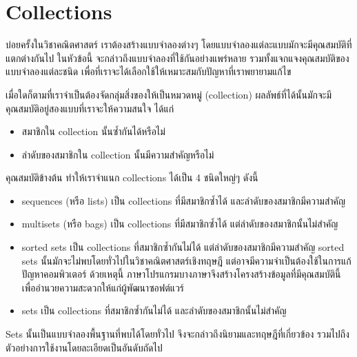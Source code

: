 \chapter{Collections}

บ่อยครั้งในวิชาคณิตศาสตร์ เราต้องสร้างแบบจำลองต่างๆ โดยแบบจำลองแต่ละแบบมักจะมีคุณสมบัติที่แตกต่างกันไป \enskip ในหัวข้อนี้ จะกล่าวถึงแบบจำลองที่ใช้กันอย่างแพร่หลาย รวมทั้งแจกแจงคุณสมบัติของแบบจำลองแต่ละชนิด เพื่อที่เราจะได้เลือกใช้ให้เหมาะสมกับปัญหาที่เราพยายามแก้ไข

เมื่อใดก็ตามที่เราจำเป็นต้องจัดกลุ่มสิ่งของให้เป็นหมวดหมู่ (collection) ผลลัพธ์ที่ได้นั้นมักจะมีคุณสมบัติอยู่สองแบบที่เราจะให้ความสนใจ ได้แก่
\begin{itemize}[]
\item สมาชิกใน collection นั้นซ้ำกันได้หรือไม่
\item ลำดับของสมาชิกใน collection นั้นมีความสำคัญหรือไม่
\end{itemize}
คุณสมบัติข้างต้น ทำให้เราจำแนก collections ได้เป็น 4 ชนิดใหญ่ๆ ดังนี้
\begin{itemize}[]
\item sequences (หรือ lists) เป็น collections ที่มีสมาชิกซ้ำได้ และลำดับของสมาชิกมีความสำคัญ
\item multisets (หรือ bags) เป็น collections ที่มีสมาชิกซ้ำได้ แต่ลำดับของสมาชิกนั้นไม่สำคัญ
\item sorted sets เป็น collections ที่สมาชิกซ้ำกันไม่ได้ แต่ลำดับของสมาชิกมีความสำคัญ \enskip sorted sets นั้นมักจะไม่พบโดยทั่วไปในวิชาคณิตศาสตร์เชิงทฤษฎี แต่อาจมีความจำเป็นต้องใช้ในการแก้ปัญหาคอมพิวเตอร์ \enskip ด้วยเหตุนี้ ภาษาโปรแกรมบางภาษาจึงสร้างโครงสร้างข้อมูลที่มีคุณสมบัตินี้เพื่ออำนวยความสะดวกให้แก่ผู้พัฒนาซอฟต์แวร์
\item sets เป็น collections ที่สมาชิกซ้ำกันไม่ได้ และลำดับของสมาชิกนั้นไม่สำคัญ
\end{itemize}
Sets นั้นเป็นแบบจำลองพื้นฐานที่พบได้โดยทั่วไป จึงจะกล่าวถึงนิยามและทฤษฎีที่เกี่ยวข้อง รวมไปถึงตัวอย่างการใช้งานโดยละเอียดเป็นอันดับถัดไป




